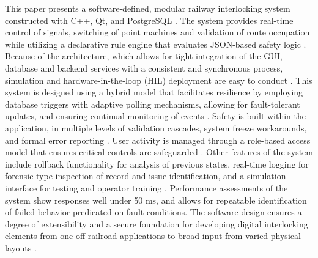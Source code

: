 This paper presents a software-defined, modular railway interlocking system constructed with C++, Qt, and PostgreSQL \cite{elms2018interlocking, blanchette2006qt4}. The system provides real-time control of signals, switching of point machines and validation of route occupation while utilizing a declarative rule engine that evaluates JSON-based safety logic \cite{collier2020interlocking, mccluskey2017automated}. Because of the architecture, which allows for tight integration of the GUI, database and backend services with a consistent and synchronous process, simulation and hardware-in-the-loop (HIL) deployment are easy to conduct \cite{lehner2018hardware, chen2019modeling}. This system is designed using a hybrid model that facilitates resilience by employing database triggers with adaptive polling mechanisms, allowing for fault-tolerant updates, and ensuring continual monitoring of events \cite{costa2016resilient, peralta2021reliable}. Safety is built within the application, in multiple levels of validation cascades, system freeze workarounds, and formal error reporting \cite{bonacchia2016validation, li2020safety}. User activity is managed through a role-based access model that ensures critical controls are safeguarded \cite{sandhu1996role, li2020secure}. Other features of the system include rollback functionality for analysis of previous states, real-time logging for forensic-type inspection of record and issue identification, and a simulation interface for testing and operator training \cite{fernandez2018log, bennett2019observability}. Performance assessments of the system show responses well under 50 ms, and allows for repeatable identification of failed behavior predicated on fault conditions. The software design ensures a degree of extensibility and a secure foundation for developing digital interlocking elements from one-off railroad applications to broad input from varied physical layouts \cite{mccarthy2019towards, haxthausen2023compositional}.
